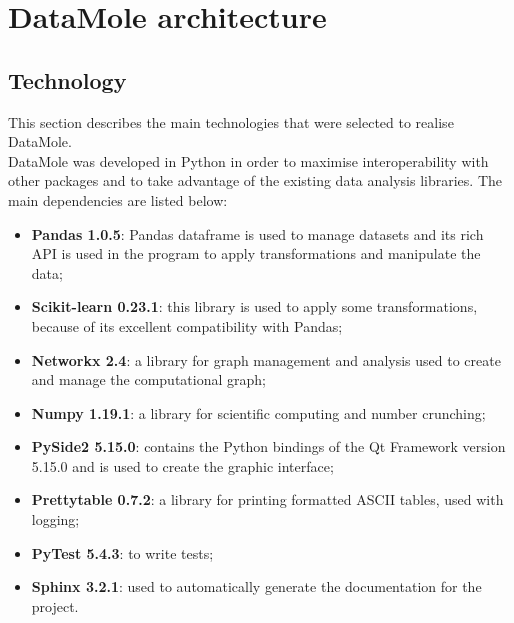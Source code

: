 
\chapter{DataMole architecture}
\label{ch:arch}

\section{Technology}
This section describes the main technologies that were selected to realise DataMole.\\
DataMole was developed in Python in order to maximise interoperability with other packages and to take advantage of the existing data analysis libraries. The main dependencies are listed below:
\begin{itemize}
	\item \textbf{Pandas 1.0.5}: Pandas dataframe is used to manage datasets and its rich API is used in the program to apply transformations and manipulate the data;
	\item \textbf{Scikit-learn 0.23.1}: this library is used to apply some transformations, because of its excellent compatibility with Pandas;
	\item \textbf{Networkx 2.4}: a library for graph management and analysis used to create and manage the computational graph;
	\item \textbf{Numpy 1.19.1}: a library for scientific computing and number crunching;
	\item \textbf{PySide2 5.15.0}: contains the Python bindings of the Qt Framework version 5.15.0 and is used to create the graphic interface;
	\item \textbf{Prettytable 0.7.2}: a library for printing formatted ASCII tables, used with logging;
	\item \textbf{PyTest 5.4.3}: to write tests;
	\item \textbf{Sphinx 3.2.1}: used to automatically generate the documentation for the project.
\end{itemize}

